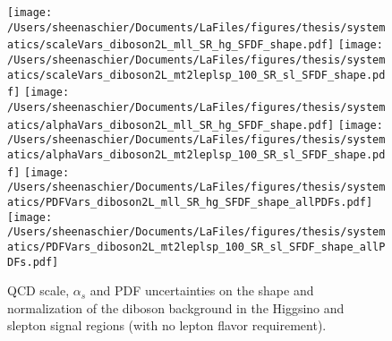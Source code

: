  \begin{figure}
  \centering
  \texttt{[image: /Users/sheenaschier/Documents/LaFiles/figures/thesis/systematics/scaleVars\_diboson2L\_mll\_SR\_hg\_SFDF\_shape.pdf]}
  \texttt{[image: /Users/sheenaschier/Documents/LaFiles/figures/thesis/systematics/scaleVars\_diboson2L\_mt2leplsp\_100\_SR\_sl\_SFDF\_shape.pdf]}
 \texttt{[image: /Users/sheenaschier/Documents/LaFiles/figures/thesis/systematics/alphaVars\_diboson2L\_mll\_SR\_hg\_SFDF\_shape.pdf]}
 \texttt{[image: /Users/sheenaschier/Documents/LaFiles/figures/thesis/systematics/alphaVars\_diboson2L\_mt2leplsp\_100\_SR\_sl\_SFDF\_shape.pdf]}
  \texttt{[image: /Users/sheenaschier/Documents/LaFiles/figures/thesis/systematics/PDFVars\_diboson2L\_mll\_SR\_hg\_SFDF\_shape\_allPDFs.pdf]}
  \texttt{[image: /Users/sheenaschier/Documents/LaFiles/figures/thesis/systematics/PDFVars\_diboson2L\_mt2leplsp\_100\_SR\_sl\_SFDF\_shape\_allPDFs.pdf]}
 \caption{QCD scale, $\alpha_{s}$ and PDF uncertainties on the shape and normalization of the diboson background in the Higgsino and slepton signal regions (with no lepton flavor requirement).}
\label{fig:theoryUncsVV}
 \end{figure}
 
